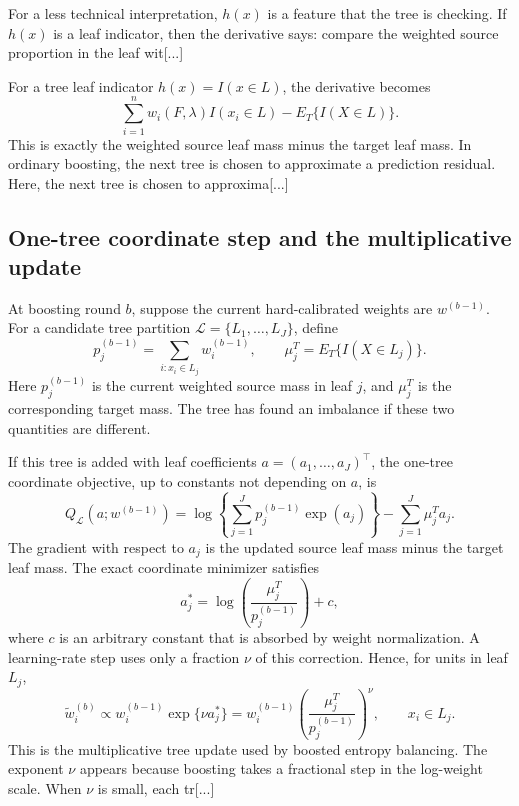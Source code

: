 \documentclass[11pt]{article}
\begin{document}
For a less technical interpretation, $h(x)$ is a feature that the tree is checking. If $h(x)$ is a leaf indicator, then the derivative says: compare the weighted source proportion in the leaf wit[...] 

For a tree leaf indicator $h(x)=I(x\in L)$, the derivative becomes
\begin{equation*}
\sum_{i=1}^n w_i(F,\lambda)I(x_i\in L)
-
E_T\{I(X\in L)\}.
\end{equation*}
This is exactly the weighted source leaf mass minus the target leaf mass. In ordinary boosting, the next tree is chosen to approximate a prediction residual. Here, the next tree is chosen to approxima[...] 

\subsection{One-tree coordinate step and the multiplicative update}

At boosting round $b$, suppose the current hard-calibrated weights are $w^{(b-1)}$. For a candidate tree partition $\mathcal{L}=\{L_1,\ldots,L_J\}$, define
\begin{equation*}
p_j^{(b-1)}
=
\sum_{i:x_i\in L_j} w_i^{(b-1)},
\qquad
\mu_j^T
=
E_T\{I(X\in L_j)\}.
\end{equation*}
Here $p_j^{(b-1)}$ is the current weighted source mass in leaf $j$, and $\mu_j^T$ is the corresponding target mass. The tree has found an imbalance if these two quantities are different.

If this tree is added with leaf coefficients $a=(a_1,\ldots,a_J)^\top$, the one-tree coordinate objective, up to constants not depending on $a$, is
\begin{equation*}
Q_{\mathcal{L}}(a;w^{(b-1)})
=
\log\left\{
\sum_{j=1}^J p_j^{(b-1)}\exp(a_j)
\right\}
-
\sum_{j=1}^J \mu_j^T a_j.
\end{equation*}
The gradient with respect to $a_j$ is the updated source leaf mass minus the target leaf mass. The exact coordinate minimizer satisfies
\begin{equation*}
a_j^*
=
\log\left(\frac{\mu_j^T}{p_j^{(b-1)}}\right)+c,
\end{equation*}
where $c$ is an arbitrary constant that is absorbed by weight normalization. A learning-rate step uses only a fraction $\nu$ of this correction. Hence, for units in leaf $L_j$,
\begin{equation}
\widetilde w_i^{(b)}
\propto
w_i^{(b-1)}\exp\{\nu a_j^*\}
=
w_i^{(b-1)}
\left(\frac{\mu_j^T}{p_j^{(b-1)}}\right)^\nu,
\qquad x_i\in L_j.
\label{eq:stagewise-multiplier}
\end{equation}
This is the multiplicative tree update used by boosted entropy balancing. The exponent $\nu$ appears because boosting takes a fractional step in the log-weight scale. When $\nu$ is small, each tr[...]
\end{document}
